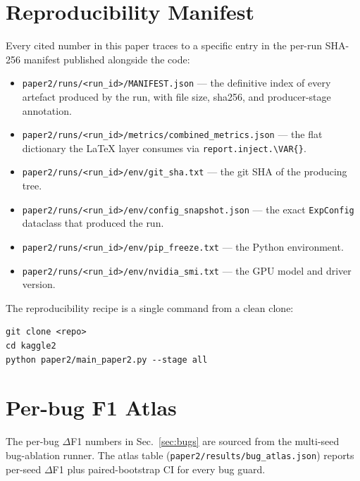 \appendix
\section{Reproducibility Manifest}
\label{sec:appendix_manifest}

Every cited number in this paper traces to a specific entry in the
per-run SHA-256 manifest published alongside the code:

\begin{itemize}
\item \texttt{paper2/runs/<run\_id>/MANIFEST.json} --- the
      definitive index of every artefact produced by the run, with
      file size, sha256, and producer-stage annotation.
\item \texttt{paper2/runs/<run\_id>/metrics/combined\_metrics.json}
      --- the flat dictionary the LaTeX layer consumes via
      \texttt{report.inject.\textbackslash VAR\{\}}.
\item \texttt{paper2/runs/<run\_id>/env/git\_sha.txt} --- the git
      SHA of the producing tree.
\item \texttt{paper2/runs/<run\_id>/env/config\_snapshot.json} ---
      the exact \texttt{ExpConfig} dataclass that produced the run.
\item \texttt{paper2/runs/<run\_id>/env/pip\_freeze.txt} --- the
      Python environment.
\item \texttt{paper2/runs/<run\_id>/env/nvidia\_smi.txt} --- the
      GPU model and driver version.
\end{itemize}

The reproducibility recipe is a single command from a clean clone:

\begin{verbatim}
git clone <repo>
cd kaggle2
python paper2/main_paper2.py --stage all
\end{verbatim}

\section{Per-bug F1 Atlas}
\label{sec:appendix_bug_atlas}

The per-bug $\Delta$F1 numbers in Sec.~\ref{sec:bugs} are sourced
from the multi-seed bug-ablation runner.  The atlas table
(\texttt{paper2/results/bug\_atlas.json}) reports per-seed
$\Delta$F1 plus paired-bootstrap CI for every bug guard.
